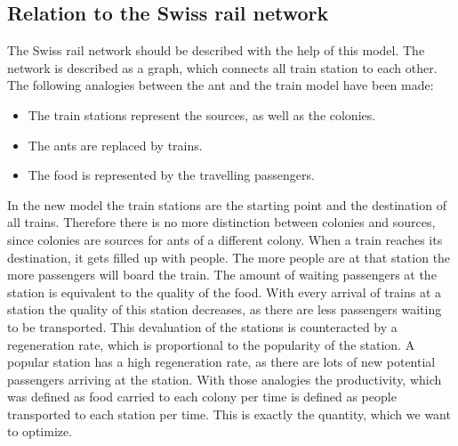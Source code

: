 \subsection{Relation to the Swiss rail network}\label{relationNetwork}
The Swiss rail network should be described with the help of this model. The network is described as a graph, which connects all train station to each other. The following analogies between the ant and the train model have been made:
\begin{itemize}
  \item The train stations represent the sources, as well as the colonies.
  \item The ants are replaced by trains.
  \item The food is represented by the travelling passengers.
\end{itemize}
 In the new model the train stations are the starting point and the destination of all trains. Therefore there is no more distinction between colonies and sources, since colonies are sources for ants of a different colony. When a train reaches its destination, it gets filled up with people. The more people are at that station the more passengers will board the train. The amount of waiting passengers at the station is equivalent to the quality of the food. With every arrival of trains at a station the quality of this station decreases, as there are less passengers waiting to be transported. This devaluation of the stations is counteracted by a regeneration rate, which is proportional to the popularity of the station. A popular station has a high regeneration rate, as there are lots of new potential passengers arriving at the station. With those analogies the productivity, which was defined as food carried to each colony per time is defined as people transported to each station per time. This is exactly the quantity, which we want to optimize.